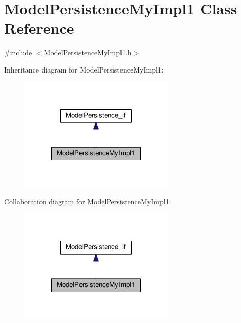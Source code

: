 \hypertarget{class_model_persistence_my_impl1}{\section{Model\-Persistence\-My\-Impl1 Class Reference}
\label{class_model_persistence_my_impl1}
}


{\ttfamily \#include $<$Model\-Persistence\-My\-Impl1.\-h$>$}



Inheritance diagram for Model\-Persistence\-My\-Impl1\-:
\nopagebreak
\begin{figure}[H]
\begin{center}
\leavevmode
\includegraphics[width=212pt]{class_model_persistence_my_impl1__inherit__graph}
\end{center}
\end{figure}


Collaboration diagram for Model\-Persistence\-My\-Impl1\-:
\nopagebreak
\begin{figure}[H]
\begin{center}
\leavevmode
\includegraphics[width=212pt]{class_model_persistence_my_impl1__coll__graph}
\end{center}
\end{figure}
